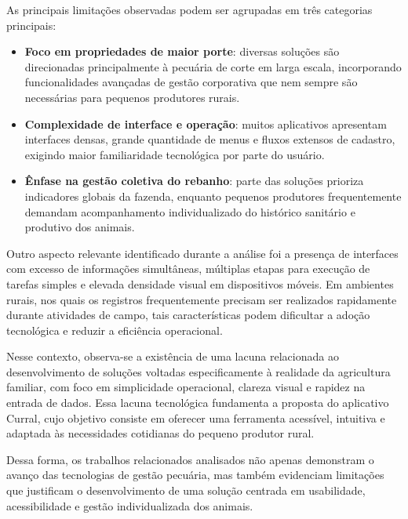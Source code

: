 As principais limitações observadas podem ser agrupadas em três categorias principais:

\begin{itemize}
    \item \textbf{Foco em propriedades de maior porte}: diversas soluções são direcionadas principalmente à pecuária de corte em larga escala, incorporando funcionalidades avançadas de gestão corporativa que nem sempre são necessárias para pequenos produtores rurais.
    
    \item \textbf{Complexidade de interface e operação}: muitos aplicativos apresentam interfaces densas, grande quantidade de menus e fluxos extensos de cadastro, exigindo maior familiaridade tecnológica por parte do usuário.
    
    \item \textbf{Ênfase na gestão coletiva do rebanho}: parte das soluções prioriza indicadores globais da fazenda, enquanto pequenos produtores frequentemente demandam acompanhamento individualizado do histórico sanitário e produtivo dos animais.
\end{itemize}

Outro aspecto relevante identificado durante a análise foi a presença de interfaces com excesso de informações simultâneas, múltiplas etapas para execução de tarefas simples e elevada densidade visual em dispositivos móveis. Em ambientes rurais, nos quais os registros frequentemente precisam ser realizados rapidamente durante atividades de campo, tais características podem dificultar a adoção tecnológica e reduzir a eficiência operacional.

Nesse contexto, observa-se a existência de uma lacuna relacionada ao desenvolvimento de soluções voltadas especificamente à realidade da agricultura familiar, com foco em simplicidade operacional, clareza visual e rapidez na entrada de dados. Essa lacuna tecnológica fundamenta a proposta do aplicativo Curral, cujo objetivo consiste em oferecer uma ferramenta acessível, intuitiva e adaptada às necessidades cotidianas do pequeno produtor rural.

Dessa forma, os trabalhos relacionados analisados não apenas demonstram o avanço das tecnologias de gestão pecuária, mas também evidenciam limitações que justificam o desenvolvimento de uma solução centrada em usabilidade, acessibilidade e gestão individualizada dos animais.